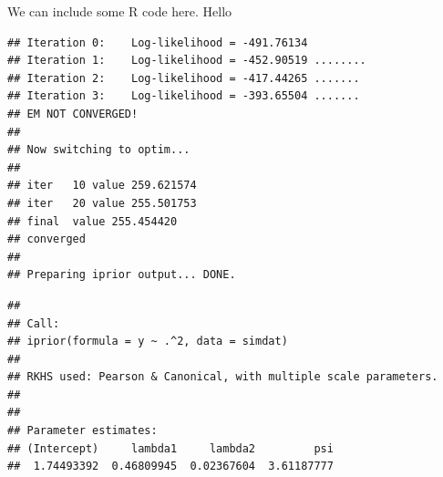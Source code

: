 %



We can include some R code here. Hello

\begin{knitrout}
\color{fgcolor}\begin{kframe}
\begin{alltt}
 \hlkwb{<-} \hlstd{(} \hlopt{~}  \hlopt{^} \hlstd{,}  
\end{alltt}
\begin{verbatim}
## Iteration 0:    Log-likelihood = -491.76134 
## Iteration 1:    Log-likelihood = -452.90519 ........
## Iteration 2:    Log-likelihood = -417.44265 .......
## Iteration 3:    Log-likelihood = -393.65504 .......
## EM NOT CONVERGED!
## 
## Now switching to optim...
## 
## iter   10 value 259.621574
## iter   20 value 255.501753
## final  value 255.454420 
## converged
## 
## Preparing iprior output... DONE.
\end{verbatim}
\begin{alltt}
\end{alltt}
\begin{verbatim}
## 
## Call:
## iprior(formula = y ~ .^2, data = simdat)
## 
## RKHS used: Pearson & Canonical, with multiple scale parameters.
## 
## 
## Parameter estimates:
## (Intercept)     lambda1     lambda2         psi 
##  1.74493392  0.46809945  0.02367604  3.61187777
\end{verbatim}
\end{kframe}
\end{knitrout}
